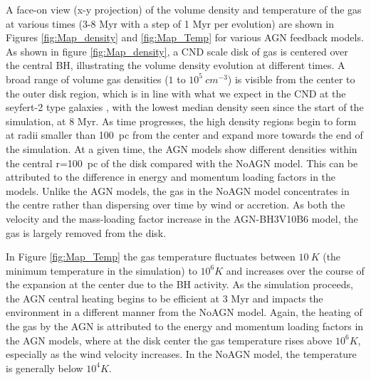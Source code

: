 \documentclass[fleqn,usenatbib]{mnras}
\begin{document}
A face-on view (x-y projection) of the volume density and temperature of the gas at various times (3-8 Myr with a step of 1 Myr per evolution) are shown in Figures \ref{fig:Map_density} and \ref{fig:Map_Temp} for various AGN feedback models.
As shown in  figure \ref{fig:Map_density}, a CND scale disk of gas is centered over the central BH, illustrating the volume density evolution at different times. A broad range of volume gas densities ($1$ to $10^5\ cm^{-3}$) is visible from the center to the outer disk region, which is in line with what we expect in the CND at the seyfert-2 type galaxies \citep[e.g NGC~1068 see;][]{Scourfield2020}, with the lowest median density seen since the start of the simulation, at 8 Myr.
As time progresses, the high density regions begin to form at radii smaller than 100~pc from the center and expand more towards the end of the simulation. At a given time, the AGN models show different densities within the central r=100~pc  of the disk compared with the NoAGN model. This can be attributed to the difference in energy and momentum loading factors in the models.   
Unlike the AGN models, the gas in the NoAGN model concentrates in the centre rather than dispersing over time by wind or accretion. 
As both the velocity and the mass-loading factor increase in the AGN-BH3V10B6 model, the gas is largely removed from the disk. 

In Figure \ref{fig:Map_Temp} the gas temperature fluctuates between  $10\ K$  (the minimum temperature in the simulation) to $10^6 K$ and increases over the course of the expansion at the center due to the BH activity. As the simulation proceeds, the AGN central heating begins to be efficient at 3 Myr and impacts the environment  in a different manner from the NoAGN model. Again, the heating of the gas by the AGN is attributed to the energy and momentum loading factors in the AGN models, where at the disk center the gas temperature rises above $10^6 K$, especially as the wind velocity increases.  In the NoAGN model, the temperature is generally below $10^4 K$. 
\end{document}
